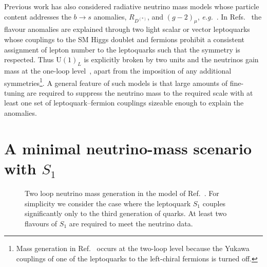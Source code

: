 Previous work has also considered radiative neutrino mass models whose particle
content addresses the $b \to s$ anomalies, $R_{D^{(*)}}$, and $(g-2)_\mu$,
\textit{e.g.}~\cite{Pas:2015hca, Cheung:2016fjo, Cheung:2017efc, Cheung:2016frv,
  Popov:2016fzr, Deppisch:2016qqd, Babu:2010vp}. In Refs.~\cite{Pas:2015hca,
  Deppisch:2016qqd} the flavour anomalies are explained through two light scalar
or vector leptoquarks whose couplings to the SM Higgs doublet and fermions
prohibit a consistent assignment of lepton number to the leptoquarks such that
the symmetry is respected. Thus $\mathrm{U}(1)_L$ is explicitly broken by two
units and the neutrinos gain mass at the one-loop
level~\cite{AristizabalSierra:2007nf}, apart from the imposition of any
additional symmetries\footnote{Mass generation in Ref.~\cite{Babu:2010vp} occurs
  at the two-loop level because the Yukawa couplings of one of the leptoquarks
  to the left-chiral fermions is turned off.}. A general feature of such models
is that large amounts of fine-tuning are required to suppress the neutrino mass
to the required scale with at least one set of leptoquark--fermion couplings
sizeable enough to explain the anomalies.

\section{A minimal neutrino-mass scenario with $S_{1}$}
\label{sec:ch4-s1-mv}

\begin{figure}[t]
  \centering
  \caption[Two loop neutrino mass generation in the model of
  Ref.~\cite{Angel:2013hla}.]{Two loop neutrino mass generation in the model of
    Ref.~\cite{Angel:2013hla}. For simplicity we consider the case where the
    leptoquark $S_{1}$ couples significantly only to the third generation of
    quarks. At least two flavours of $S_{1}$ are required to meet the neutrino
    data.}
  \label{fig:ch4-neutrinomass}
\end{figure}

